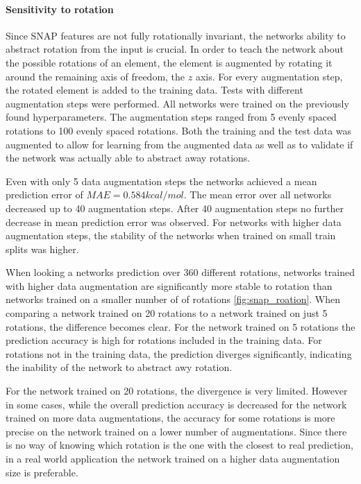 \paragraph{Sensitivity to rotation}
Since SNAP features are not fully rotationally invariant, the networks ability to abstract rotation from the input is crucial.
In order to teach the network about the possible rotations of an element, 
the element is augmented by rotating it around the remaining axis of freedom, the $z$ axis.
For every augmentation step, the rotated element is added to the training data.
Tests with different augmentation steps were performed.
All networks were trained on the previously found hyperparameters.
The augmentation steps ranged from 5 evenly spaced rotations to 100 evenly spaced rotations.
Both the training and the test data was augmented to allow for learning from the augmented data
as well as to validate if the network was actually able to abstract away rotations.

Even with only 5 data augmentation steps the networks achieved a mean prediction error of $MAE = 0.584 kcal/mol$.
The mean error over all networks decreased up to 40 augmentation steps.
After 40 augmentation steps no further decrease in mean prediction error was observed.%
For networks with higher data augmentation steps, the stability of the networks when trained on small train splits was higher.

When looking a networks prediction over 360 different rotations, networks trained with higher data augmentation 
are significantly more stable to rotation than networks trained on a smaller number of of rotations \ref{fig:snap_roation}.
When comparing a network trained on 20 rotations to a network trained on just 5 rotations,
the difference becomes clear.
For the network trained on 5 rotations the prediction accuracy is high for rotations included in the training data.
For rotations not in the training data, the prediction diverges significantly, indicating the inability of the network to abstract awy rotation.

For the network trained on 20 rotations, the divergence is very limited.
However in some cases, while the overall prediction accuracy is decreased for the network trained on 
more data augmentations, the accuracy for some rotations is more precise on the network trained on a lower number of augmentations.
Since there is no way of knowing which rotation is the one with the closest to real prediction, in 
a real world application the network trained on a higher data augmentation size is preferable.

